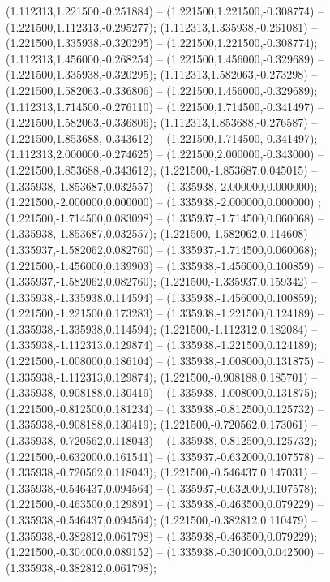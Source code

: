  (1.112313,1.221500,-0.251884) -- (1.221500,1.221500,-0.308774) -- (1.221500,1.112313,-0.295277);
 (1.112313,1.335938,-0.261081) -- (1.221500,1.335938,-0.320295) -- (1.221500,1.221500,-0.308774);
 (1.112313,1.456000,-0.268254) -- (1.221500,1.456000,-0.329689) -- (1.221500,1.335938,-0.320295);
 (1.112313,1.582063,-0.273298) -- (1.221500,1.582063,-0.336806) -- (1.221500,1.456000,-0.329689);
 (1.112313,1.714500,-0.276110) -- (1.221500,1.714500,-0.341497) -- (1.221500,1.582063,-0.336806);
 (1.112313,1.853688,-0.276587) -- (1.221500,1.853688,-0.343612) -- (1.221500,1.714500,-0.341497);
 (1.112313,2.000000,-0.274625) -- (1.221500,2.000000,-0.343000) -- (1.221500,1.853688,-0.343612);
 (1.221500,-1.853687,0.045015) -- (1.335938,-1.853687,0.032557) -- (1.335938,-2.000000,0.000000);
 (1.221500,-2.000000,0.000000) -- (1.335938,-2.000000,0.000000) ;
 (1.221500,-1.714500,0.083098) -- (1.335937,-1.714500,0.060068) -- (1.335938,-1.853687,0.032557);
 (1.221500,-1.582062,0.114608) -- (1.335937,-1.582062,0.082760) -- (1.335937,-1.714500,0.060068);
 (1.221500,-1.456000,0.139903) -- (1.335938,-1.456000,0.100859) -- (1.335937,-1.582062,0.082760);
 (1.221500,-1.335937,0.159342) -- (1.335938,-1.335938,0.114594) -- (1.335938,-1.456000,0.100859);
 (1.221500,-1.221500,0.173283) -- (1.335938,-1.221500,0.124189) -- (1.335938,-1.335938,0.114594);
 (1.221500,-1.112312,0.182084) -- (1.335938,-1.112313,0.129874) -- (1.335938,-1.221500,0.124189);
 (1.221500,-1.008000,0.186104) -- (1.335938,-1.008000,0.131875) -- (1.335938,-1.112313,0.129874);
 (1.221500,-0.908188,0.185701) -- (1.335938,-0.908188,0.130419) -- (1.335938,-1.008000,0.131875);
 (1.221500,-0.812500,0.181234) -- (1.335938,-0.812500,0.125732) -- (1.335938,-0.908188,0.130419);
 (1.221500,-0.720562,0.173061) -- (1.335938,-0.720562,0.118043) -- (1.335938,-0.812500,0.125732);
 (1.221500,-0.632000,0.161541) -- (1.335937,-0.632000,0.107578) -- (1.335938,-0.720562,0.118043);
 (1.221500,-0.546437,0.147031) -- (1.335938,-0.546437,0.094564) -- (1.335937,-0.632000,0.107578);
 (1.221500,-0.463500,0.129891) -- (1.335938,-0.463500,0.079229) -- (1.335938,-0.546437,0.094564);
 (1.221500,-0.382812,0.110479) -- (1.335938,-0.382812,0.061798) -- (1.335938,-0.463500,0.079229);
 (1.221500,-0.304000,0.089152) -- (1.335938,-0.304000,0.042500) -- (1.335938,-0.382812,0.061798);
